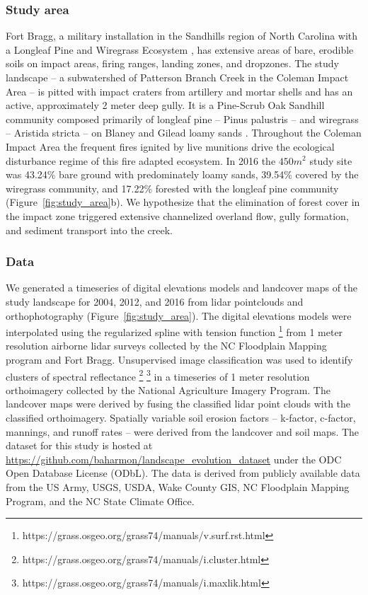 \documentclass[final,3p,times,twocolumn]{elsarticle}
\begin{document}
\subsubsection{Study area}
Fort Bragg, a military installation in the Sandhills region of North Carolina %
with a Longleaf Pine and Wiregrass Ecosystem \citep{Sorrie2006},
has extensive areas of bare, erodible soils
on impact areas, firing ranges, landing zones, and dropzones. 
%
The study landscape
-- a subwatershed of Patterson Branch Creek %
in the Coleman Impact Area --
is pitted with impact craters from artillery and mortar shells
and has an active, approximately 2 meter deep gully. 
%
It is a Pine-Scrub Oak Sandhill community
composed primarily of longleaf pine -- Pinus palustris --
and wiregrass -- Aristida stricta --
on Blaney and Gilead loamy sands 
\citep{Sorrie2004}. 
%
Throughout the Coleman Impact Area
the frequent fires ignited by live munitions
drive the ecological disturbance regime
of this fire adapted ecosystem.
%
In 2016 the  $450 m^{2}$ study site was
43.24\% bare ground with predominately loamy sands,
39.54\% covered by the wiregrass community, and
17.22\% forested with the longleaf pine community 
(Figure~\ref{fig:study_area}b). 
%
We hypothesize that the elimination of forest cover
in the impact zone
triggered extensive channelized overland flow,
gully formation, and sediment transport into the creek. 

\subsubsection{Data}
We generated a timeseries of 
digital elevations models and landcover maps 
of the study landscape for 2004, 2012, and 2016
from lidar pointclouds and orthophotography
(Figure~\ref{fig:study_area}). 
%
The digital elevations models were interpolated using 
the regularized spline with tension function \citep{Mitasova1993,Mitasova2005}
\footnote{https://grass.osgeo.org/grass74/manuals/v.surf.rst.html}
from 1 meter resolution airborne lidar surveys 
collected by the NC Floodplain Mapping program and Fort Bragg. 
%
Unsupervised image classification was used to identify clusters of spectral reflectance
\footnote{https://grass.osgeo.org/grass74/manuals/i.cluster.html}
\footnote{https://grass.osgeo.org/grass74/manuals/i.maxlik.html}
in a timeseries of 1 meter resolution orthoimagery 
collected by the National Agriculture Imagery Program.
%
The landcover maps were derived by fusing the
classified lidar point clouds with the classified orthoimagery.
%
Spatially variable soil erosion factors -- k-factor, c-factor, mannings, and runoff rates --
were derived from the landcover and soil maps.
%
The dataset for this study is hosted at 
\url{https://github.com/baharmon/landscape\_evolution_dataset}
under the ODC Open Database License (ODbL).
%
The data is derived from publicly available data from
the US Army, USGS, USDA, Wake County GIS, NC Floodplain
Mapping Program, and the NC State Climate Office.
\end{document}
